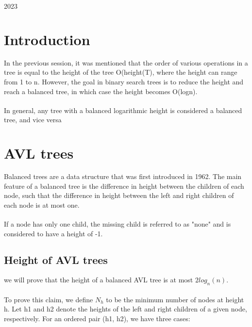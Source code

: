 \documentclass[a4paper, 11pt, oneside]{book} %
\begin{document}
\begin{titlepage}
	\vspace{0.5\baselineskip} %
	
	\vfill %
	
	
	
	
	\vspace{0.3\baselineskip} %
	
	2023 %

\end{titlepage}

\section{Introduction}
In the previous session, it was mentioned that the order of various operations in a tree is equal to the height of the tree O(height(T), where the height can range from 1 to n. However, the goal in binary search trees is to reduce the height and reach a balanced tree, in which case the height becomes O(logn).
\\
\\
In general, any tree with a balanced logarithmic height is considered a balanced tree, and vice versa

\section{AVL trees}
Balanced trees are a data structure that was first introduced in 1962. The main feature of a balanced tree is the difference in height between the children of each node, such that the difference in height between the left and right children of each node is at most one.
\\
\\
If a node has only one child, the missing child is referred to as "none" and is considered to have a height of -1.

\subsection{Height of AVL trees}
 we will prove that the height of a balanced AVL tree is at most $2log_n(n)$.
\\
\\
To prove this claim, we define $N_h$ to be the minimum number of nodes at height h. Let h1 and h2 denote the heights of the left and right children of a given node, respectively. For an ordered pair (h1, h2), we have three cases:
\end{document}
